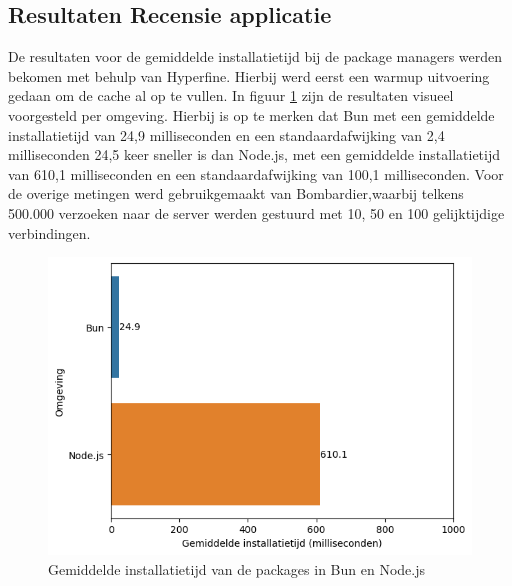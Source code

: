 \subsection{Resultaten Recensie applicatie}
De resultaten voor de gemiddelde installatietijd bij de package managers werden bekomen met behulp van Hyperfine.
Hierbij werd eerst een warmup uitvoering gedaan om de cache al op te vullen.
In figuur \ref{fig:installatietijdapp} zijn de resultaten visueel voorgesteld per omgeving.
Hierbij is op te merken dat Bun met een gemiddelde installatietijd van 24,9 milliseconden en een standaardafwijking van 2,4 milliseconden 24,5 keer sneller 
is dan Node.js, met een gemiddelde installatietijd van 610,1 milliseconden en een standaardafwijking van 100,1 milliseconden.
Voor de overige metingen werd gebruikgemaakt van Bombardier,waarbij
telkens 500.000 verzoeken naar de server werden gestuurd met 10, 50 en 100 gelijktijdige verbindingen.
\begin{figure}[H]
  \centering
  \includegraphics{graphics/install.png}
  \caption{\label{fig:installatietijdapp}Gemiddelde installatietijd van de packages in Bun en Node.js}
\end{figure}



